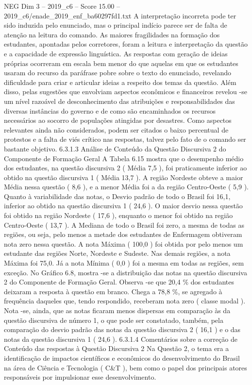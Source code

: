 \begin{textsample}{NEG Dim 3 – 2019\_c6 – Score 15.00 – 2019\_c6/enade\_2019\_enf\_ba60297fd1.txt}
A interpretação incorreta pode ter sido induzida pelo enunciado, mas o principal indício parece ser de falta de atenção na leitura do comando.
As maiores fragilidades na formação dos estudantes, apontadas pelos corretores, foram a leitura e interpretação da questão e a capacidade de expressão linguística.
As respostas com geração de ideias próprias ocorreram em escala bem menor do que aquelas em que os estudantes usaram do recurso da paráfrase pobre sobre o texto do enunciado, revelando dificuldade para criar e articular ideias a respeito dos temas da questão.
Além disso, pelas sugestões que envolviam aspectos econômicos e financeiros revelou -se um nível razoável de desconhecimento das atribuições e responsabilidades das diversas instâncias do governo e de como são encaminhados os recursos necessários ao socorro de populações atingidas por desastres.
Como aspectos relevantes ainda não considerados, podem ser citados o baixo percentual de protestos e a falta de viés crítico nas respostas, talvez pelo fato de o comando ser bastante objetivo. 6.3.1.3 Análise de Conteúdo da Questão Discursiva 2 do Componente de Formação Geral A Tabela 6.15 mostra que o desempenho médio dos estudantes, na questão discursiva 2 ( Média 7,5 ), foi praticamente inferior ao obtido na questão discursiva 1 ( Média 13,7 ).
A região Nordeste obteve a maior Média nessa questão ( 8,6 ), e a menor Média foi a da região Centro-Oeste ( 5,9 ).
Quanto à variabilidade das notas, o Desvio padrão de todo o Brasil foi 16,1, inferior ao obtido na questão discursiva 1 ( 24,6 ).
O maior desvio nessa questão foi obtido na região Nordeste ( 17,6 ), enquanto o menor foi obtido na região Centro-Oeste ( 13,7 ).
A Mediana de todo o Brasil foi zero, a mesma de todas as regiões, ou seja, pelo menos a metade dos estudantes de Enfermagem obtiveram nota zero nessa questão.
A nota Máxima ( 100,0 ) foi obtida por pelo menos um estudante das regiões Norte, Nordeste e Sudeste.
Nas demais regiões, a nota Máxima foi 75,0.
Já a nota Mínima ( 0,0 ) foi a mesma em todas as regiões, sem exceção.
No Gráfico 6.8, mostra -se a distribuição das notas na questão discursiva 2 do Componente de Formação Geral.
Observa -se que 20,4 \% dos estudantes deixaram a resposta à questão em branco.
Chega a 78,8 \%, se agregado à frequência daqueles que, tendo respondido, receberam nota zero ( classe modal ).
Nota -se, ainda, que as notas ficaram menos dispersas em comparação às da questão discursiva de número 1, o que pode ser constatado, também, pela comparação do desvio padrão das notas da questão discursiva 2 ( 16,1 ) e o das notas da questão discursiva 1 ( 24,6 ). 6.3.1.4 Comentários sobre a correção de Conteúdo das respostas à Questão Discursiva 2 Na Questão 2, o tema era a identificação de impactos científicos e econômicos do desenvolvimento do Brasil na área de Ciência e Tecnologia ( C\&T ), bem como o papel dos principais atores responsáveis por impulsionar esse desenvolvimento.

\end{textsample}
